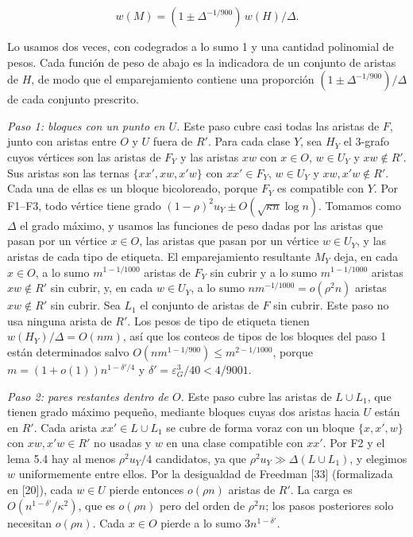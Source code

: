 \documentclass[spanish,11pt,a4paper]{article}
\begin{document}
\nopagebreak[4]
\[w(M)=(1\pm\Delta^{-1/900})\,w(H)/\Delta.\]

Lo usamos dos veces, con codegrados a lo sumo 1 y una cantidad polinomial de pesos. Cada función de peso de abajo es la indicadora de un conjunto de aristas de \(H\), de modo que el emparejamiento contiene una proporción \((1\pm\Delta^{-1/900})/\Delta\) de cada conjunto prescrito.

\emph{Paso 1: bloques con un punto en \(U\).} Este paso cubre casi todas las aristas de \(F\), junto con aristas entre \(O\) y \(U\) fuera de \(R'\). Para cada clase \(Y\), sea \(H_Y\) el 3-grafo cuyos vértices son las aristas de \(F_Y\) y las aristas \(xw\) con \(x\in O\), \(w\in U_Y\) y \(xw\notin R'\). Sus aristas son las ternas \(\{xx',xw,x'w\}\) con \(xx'\in F_Y\), \(w\in U_Y\) y \(xw,x'w\notin R'\). Cada una de ellas es un bloque bicoloreado, porque \(F_Y\) es compatible con \(Y\). Por F1--F3, todo vértice tiene grado \((1-\rho)^2u_Y\pm O(\sqrt{\kappa n}\log n)\). Tomamos como \(\Delta\) el grado máximo, y usamos las funciones de peso dadas por las aristas que pasan por un vértice \(x\in O\), las aristas que pasan por un vértice \(w\in U_Y\), y las aristas de cada tipo de etiqueta. El emparejamiento resultante \(M_Y\) deja, en cada \(x\in O\), a lo sumo \(m^{1-1/1000}\) aristas de \(F_Y\) sin cubrir y a lo sumo \(m^{1-1/1000}\) aristas \(xw\notin R'\) sin cubrir, y, en cada \(w\in U_Y\), a lo sumo \(nm^{-1/1000}=o(\rho^2n)\) aristas \(xw\notin R'\) sin cubrir. Sea \(L_1\) el conjunto de aristas de \(F\) sin cubrir. Este paso no usa ninguna arista de \(R'\). Los pesos de tipo de etiqueta tienen \(w(H_Y)/\Delta=O(nm)\), así que los conteos de tipos de los bloques del paso 1 están determinados salvo \(O(nm^{1-1/900})\le m^{2-1/1000}\), porque \(m=(1+o(1))n^{1-\delta'/4}\) y \(\delta'=\varepsilon_G^3/40<4/9001\).

\emph{Paso 2: pares restantes dentro de \(O\).} Este paso cubre las aristas de \(L\cup L_1\), que tienen grado máximo pequeño, mediante bloques cuyas dos aristas hacia \(U\) están en \(R'\). Cada arista \(xx'\in L\cup L_1\) se cubre de forma voraz con un bloque \(\{x,x',w\}\) con \(xw,x'w\in R'\) no usadas y \(w\) en una clase compatible con \(xx'\). Por F2 y el lema 5.4 hay al menos \(\rho^2u_Y/4\) candidatos, ya que \(\rho^2u_Y\gg\Delta(L\cup L_1)\), y elegimos \(w\) uniformemente entre ellos. Por la desigualdad de Freedman {[}33{]} (formalizada en {[}20{]}), cada \(w\in U\) pierde entonces \(o(\rho n)\) aristas de \(R'\). La carga es \(O(n^{1-\delta'}/\kappa^2)\), que es \(o(\rho n)\) pero del orden de \(\rho^2n\); los pasos posteriores solo necesitan \(o(\rho n)\). Cada \(x\in O\) pierde a lo sumo \(3n^{1-\delta'}\).
\end{document}
